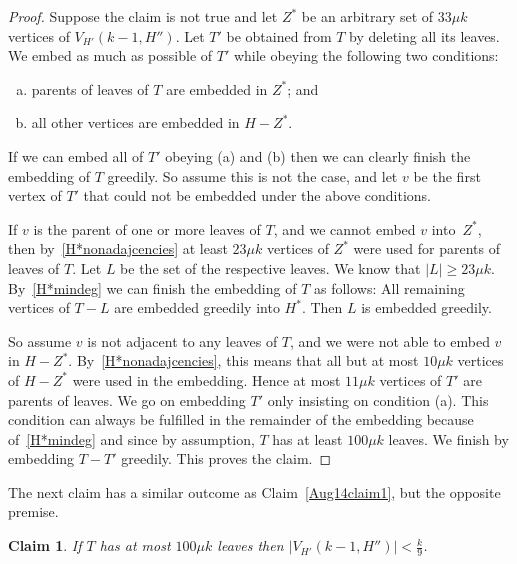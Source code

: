 \documentclass[12pt]{article}
\newtheorem{claim}[theorem]{Claim}
\begin{document}
\begin{proof}
    Suppose the claim is not true and let $Z^*$ be an arbitrary set of $33\mu k$ vertices of $V_{H'}(k-1, H'')$.
       Let $T'$ be obtained from $T$ by deleting all its leaves.   We embed as much as possible of $T'$  while obeying the following two conditions: 
       
  \begin{enumerate}[(a)]
  \item parents of leaves of $T$ are embedded in $Z^*$; and
  \item all other vertices are embedded in $H-Z^*$.
  \end{enumerate}
  If we can embed all of $T'$ obeying (a) and (b) then we can clearly finish the embedding of $T$ greedily. So assume this is not the case, and let $v$ be the first vertex of $T'$ that could not be embedded under the above conditions. 
  
  If $v$ is the parent of one or more leaves of $T$, and we cannot embed $v$ into~$Z^*$, then by~\eqref{H*nonadajcencies} at least $23\mu k$ 
  vertices of $Z^*$ were used for parents of leaves of $T$. Let $L$ be the set of the respective leaves. We know that $|L|\ge 23\mu k$. By~\eqref{H*mindeg} we can finish the embedding of $T$ as follows: All remaining vertices of $T-L$ are embedded greedily into $H^*$. Then $L$ is embedded greedily.
  
  So assume $v$ is not adjacent to any leaves of $T$, and we were not able to embed $v$ in $H-Z^*$. By~\eqref{H*nonadajcencies}, this means that all but at most $10\mu k$ vertices of $H-Z^*$ were used in the embedding. Hence at most $11\mu k$ vertices of $T'$ are parents of leaves. We go on embedding $T'$ only insisting on condition (a). This condition can always be fulfilled in the remainder of the embedding because of~\eqref{H*mindeg} and since by assumption, $T$ has at least $100\mu k$ leaves. We finish by embedding $T- T'$ greedily.
  This proves the claim. 
\end{proof}
\fi

The next claim has a similar outcome as Claim~\ref{Aug14claim1}, but the opposite premise.

\begin{claim}
\label{Aug14claim2}
 If $T$ has at most  $100\mu k$ leaves then $|V_{H'}(k-1,H'')|< \frac{k}{9}$.
\end{claim}
\end{document}
